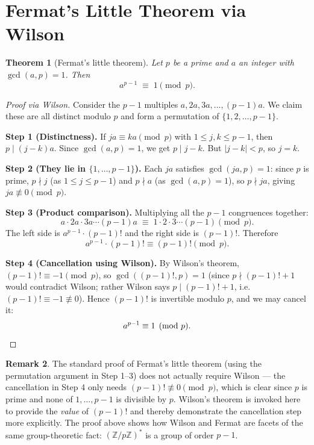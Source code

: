 \documentclass[12pt,a4paper]{amsart}
\newtheorem{theorem}{Theorem}[section]
\theoremstyle{definition}
\newtheorem{remark}[theorem]{Remark}
\newcommand{\Z}{\mathbb{Z}}
\begin{document}
\section{Fermat's Little Theorem via Wilson}

\begin{theorem}[Fermat's little theorem]\label{thm:fermat}
  Let $p$ be a prime and $a$ an integer with $\gcd(a,p) = 1$.  Then
  \[
    a^{p-1} \;\equiv\; 1 \pmod p.
  \]
\end{theorem}

\begin{proof}[Proof via Wilson]
  Consider the $p-1$ multiples $a, 2a, 3a, \ldots, (p-1)a$.
  We claim these are all distinct modulo $p$ and form a permutation of
  $\{1, 2, \ldots, p-1\}$.

  \textbf{Step 1 (Distinctness).}
  If $ja \equiv ka \pmod p$ with $1 \leq j, k \leq p-1$, then
  $p \mid (j-k)a$.  Since $\gcd(a,p)=1$, we get $p \mid j-k$.
  But $|j-k| < p$, so $j = k$.

  \textbf{Step 2 (They lie in $\{1,\ldots,p-1\}$).}
  Each $ja$ satisfies $\gcd(ja, p) = 1$: since $p$ is prime, $p \nmid j$
  (as $1 \leq j \leq p-1$) and $p \nmid a$ (as $\gcd(a,p)=1$), so $p \nmid ja$,
  giving $ja \not\equiv 0 \pmod p$.

  \textbf{Step 3 (Product comparison).}
  Multiplying all the $p-1$ congruences together:
  \[
    a \cdot 2a \cdot 3a \cdots (p-1)a \;\equiv\; 1 \cdot 2 \cdot 3 \cdots (p-1) \pmod p.
  \]
  The left side is $a^{p-1} \cdot (p-1)!$ and the right side is $(p-1)!$.
  Therefore
  \[
    a^{p-1} \cdot (p-1)! \equiv (p-1)! \pmod p.
  \]

  \textbf{Step 4 (Cancellation using Wilson).}
  By Wilson's theorem, $(p-1)! \equiv -1 \pmod p$, so $\gcd((p-1)!, p) = 1$
  (since $p \nmid (p-1)!+1$ would contradict Wilson; rather Wilson says
  $p \mid (p-1)!+1$, i.e.\ $(p-1)! \equiv -1 \not\equiv 0$).
  Hence $(p-1)!$ is invertible modulo $p$, and we may cancel it:
  \[
    a^{p-1} \equiv 1 \pmod p. \qedhere
  \]
\end{proof}

\begin{remark}
  The standard proof of Fermat's little theorem (using the permutation
  argument in Step 1--3) does not actually require Wilson — the cancellation
  in Step 4 only needs $(p-1)! \not\equiv 0 \pmod p$, which is clear since
  $p$ is prime and none of $1, \ldots, p-1$ is divisible by $p$.
  Wilson's theorem is invoked here to provide the \emph{value} of $(p-1)!$
  and thereby demonstrate the cancellation step more explicitly.
  The proof above shows how Wilson and Fermat are facets of the same
  group-theoretic fact: $(\Z/p\Z)^*$ is a group of order $p-1$.
\end{remark}
\end{document}
